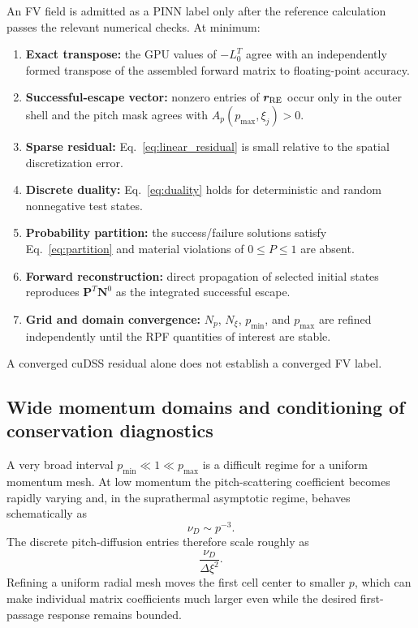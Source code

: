 \documentclass[11pt]{article}
\newcommand{\Pvec}{\bm P}
\newcommand{\Nvec}{\bm N}
\newcommand{\rRE}{\bm r_{\rm RE}}
\begin{document}
An FV field is admitted as a PINN label only after the reference calculation passes the
relevant numerical checks.  At minimum:
\begin{enumerate}[leftmargin=2.3em]
 \item \textbf{Exact transpose:} the GPU values of $-L_0^T$ agree with an independently
       formed transpose of the assembled forward matrix to floating-point accuracy.
 \item \textbf{Successful-escape vector:} nonzero entries of $\rRE$ occur only in the
       outer shell and the pitch mask agrees with $A_p(p_{\max},\xi_j)>0$.
 \item \textbf{Sparse residual:} Eq.~\eqref{eq:linear_residual} is small relative to the
       spatial discretization error.
 \item \textbf{Discrete duality:} Eq.~\eqref{eq:duality} holds for deterministic and
       random nonnegative test states.
 \item \textbf{Probability partition:} the success/failure solutions satisfy
       Eq.~\eqref{eq:partition} and material violations of $0\le P\le1$ are absent.
 \item \textbf{Forward reconstruction:} direct propagation of selected initial states
       reproduces $\Pvec^T\Nvec^0$ as the integrated successful escape.
 \item \textbf{Grid and domain convergence:} $N_p$, $N_\xi$, $p_{\min}$, and $p_{\max}$
       are refined independently until the RPF quantities of interest are stable.
\end{enumerate}
A converged cuDSS residual alone does not establish a converged FV label.

\subsection{Wide momentum domains and conditioning of conservation diagnostics}
\label{sec:wide_domain}

A very broad interval $p_{\min}\ll1\ll p_{\max}$ is a difficult regime for a uniform
momentum mesh.  At low momentum the pitch-scattering coefficient becomes rapidly varying
and, in the suprathermal asymptotic regime, behaves schematically as
\begin{equation}
 \nu_D\sim p^{-3}.
\end{equation}
The discrete pitch-diffusion entries therefore scale roughly as
\begin{equation}
 \frac{\nu_D}{\Delta\xi^2}.
\end{equation}
Refining a uniform radial mesh moves the first cell center to smaller $p$, which can make
individual matrix coefficients much larger even while the desired first-passage response
remains bounded.
\end{document}
